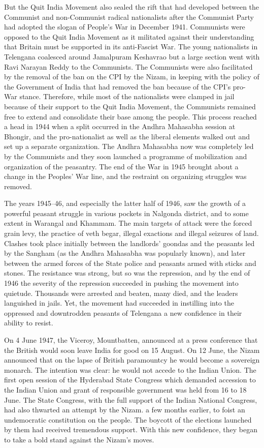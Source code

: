 \begin{multicols}{2}
But the Quit India Movement also sealed the rift that had developed between the Communist and non-Communist radical nationalists after the Communist Party had adopted the slogan of People's War in December 1941. Communists were opposed to the Quit India Movement as it militated against their understanding that Britain must be supported in its anti-Fascist War. The young nationalists in Telengana coalesced around Jamalpuram Keshavrao but a large section went with Ravi Narayan Reddy to the Communists. The Communists were also facilitated by the removal of the ban on the CPI by the Nizam, in keeping with the policy of the Government of India that had removed the ban because of the CPI's pro- War stance. Therefore, while most of the nationalists were clamped in jail because of their support to the Quit India Movement, the Communists remained free to extend and consolidate their base among the people. This process reached a head in 1944 when a split occurred in the Andhra Mahasabha session at Bhongir, and the pro-nationalist as well as the liberal elements walked out and set up a separate organization. The Andhra Mahasabha now was completely led by the Communists and they soon launched a programme of mobilization and organization of the peasantry. The end of the War in 1945 brought about a change in the Peoples' War line, and the restraint on organizing struggles was removed. 

The years 1945--46, and especially the latter half of 1946, saw the growth of a powerful peasant struggle in various pockets in Nalgonda district, and to some extent in Warangal and Khammam. The main targets of attack were the forced grain levy, the practice of veth begar, illegal exactions and illegal seizures of land. Clashes took place initially between the landlords' goondas and the peasants led by the Sangham (as the Andhra Mahasabha was popularly known), and later between the armed forces of the State police and peasants armed with sticks and stones. The resistance was strong, but so was the repression, and by the end of 1946 the severity of the repression succeeded in pushing the movement into quietude. Thousands were arrested and beaten, many died, and the leaders languished in jails. Yet, the movement had succeeded in instilling into the oppressed and downtrodden peasants of Telengana a new confidence in their ability to resist. 

On 4 June 1947, the Viceroy, Mountbatten, announced at a press conference that the British would soon leave India for good on 15 August. On 12 June, the Nizam announced that on the lapse of British paramountcy he would become a sovereign monarch. The intention was clear: he would not accede to the Indian Union. The first open session of the Hyderabad State Congress which demanded accession to the Indian Union and grant of responsible government was held from 16 to 18 June. The State Congress, with the full support of the Indian National Congress, had also thwarted an attempt by the Nizam. a few months earlier, to foist an undemocratic constitution on the people. The boycott of the elections launched by them had received tremendous support. With this new confidence, they began to take a bold stand against the Nizam's moves. 


\end{multicols}
